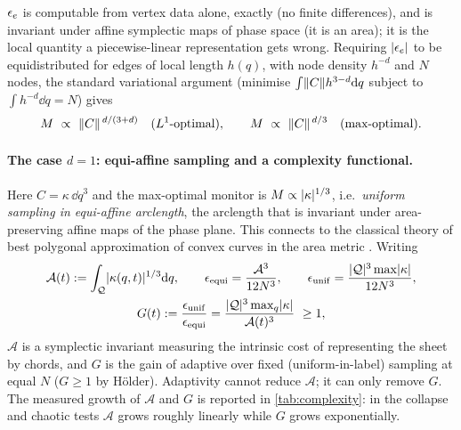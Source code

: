 $\epsilon_e$ is computable from vertex data alone, exactly (no finite differences), and is invariant under affine
symplectic maps of phase space (it is an area); it is the local quantity a piecewise-linear
representation gets wrong. Requiring $\lvert \epsilon_e\rvert$ to be equidistributed for edges of local length $h(q)$, with
node density $h^{-d}$ and $N$ nodes, the standard variational argument (minimise $\int\lVert C\rVert h^{3-d}\mathrm{d} q$ subject
to $\int h^{-d}\dd q=N$) gives
\begin{equation}\label{eq:monitor}
M\ \propto\ \norm{C}^{\,d/(3+d)}\quad(L^1\text{-optimal}),\qquad M\ \propto\ \norm{C}^{\,d/3}\quad(\text{max-optimal}).
\end{equation}

\paragraph{The case $d=1$: equi-affine sampling and a complexity functional.} Here $C=\kappa\,\dd q^3$ and the
max-optimal monitor is $M\propto\lvert \kappa\rvert^{1/3}$, i.e.\ \emph{uniform sampling in equi-affine arclength}, the
arclength that is invariant under area-preserving affine maps of the phase plane. This connects to the classical
theory of best polygonal approximation of convex curves in the area metric \cite{McClureVitale1975}. Writing
\begin{equation}\label{eq:complexity}
\begin{gathered}
\mathcal A(t):=\int_{\mathcal{Q}}\lvert \kappa(q,t)\rvert^{1/3}\mathrm{d} q,\qquad
\epsilon_{\rm equi}=\frac{\mathcal A^3}{12N^3},\qquad
\epsilon_{\rm unif}=\frac{\lvert \mathcal{Q}\rvert^3\max\lvert \kappa\rvert}{12N^3},\\
G(t):=\frac{\epsilon_{\rm unif}}{\epsilon_{\rm equi}}=\frac{\lvert \mathcal{Q}\rvert^3\max_q\lvert \kappa\rvert}{\mathcal A(t)^3}\ \ge1 ,
\end{gathered}
\end{equation}
$\mathcal A$ is a symplectic invariant measuring the intrinsic cost of representing the sheet by chords, and $G$ is
the gain of adaptive over fixed (uniform-in-label) sampling at equal $N$ ($G\ge1$ by H\"older). Adaptivity cannot
reduce $\mathcal A$; it can only remove $G$. The measured growth of $\mathcal A$ and $G$ is reported in
\cref{tab:complexity}: in the collapse and chaotic tests $\mathcal A$ grows roughly linearly while $G$ grows
exponentially.

